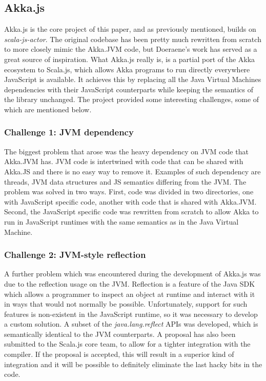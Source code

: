 \documentclass{sig-alternate}
\begin{document}
\subsection{Akka.js}

Akka.js is the core project of this paper, and as previously mentioned, builds on \textit{scala-js-actor}. The original codebase has been pretty much rewritten from scratch to more closely mimic the Akka.JVM code, but Doeraene's work has served as a great source of inspiration.
What Akka.js really is, is a partial port of the Akka ecosystem to Scala.js, which allows Akka programs to run directly everywhere JavaScript is available. It achieves this by replacing all the Java Virtual Machines dependencies with their JavaScript counterparts while keeping the semantics of the library unchanged. The project provided some interesting challenges, some of which are mentioned below.

\subsubsection{Challenge 1: JVM dependency}

The biggest problem that arose was the heavy dependency on JVM code that Akka.JVM has. JVM code is intertwined with code that can be shared with Akka.JS and there is no easy way to remove it. Examples of such dependency are threads, JVM data structures and JS semantics differing from the JVM.
The problem was solved in two ways. First, code was divided in two directories, one with JavaScript specific code, another with code that is shared with Akka.JVM. Second, the JavaScript specific code was rewritten from scratch to allow Akka to run in JavaScript runtimes with the same semantics as in the Java Virtual Machine.

\subsubsection{Challenge 2: JVM-style reflection}

A further problem which was encountered during the development of Akka.js was due to the reflection usage on the JVM. Reflection is a feature of the Java SDK which allows a programmer to inspect an object at runtime and interact with it in ways that would not normally be possible. Unfortunately, support for such features is non-existent in the JavaScript runtime, so it was necessary to develop a custom solution. A subset of the \emph{java.lang.reflect} APIs was developed, which is semantically identical to the JVM counterparts. A proposal has also been submitted to the Scala.js core team, to allow for a tighter integration with the compiler.
If the proposal is accepted, this will result in a superior kind of integration and it will be possible to definitely eliminate the last hacky bits in the code.
\end{document}
